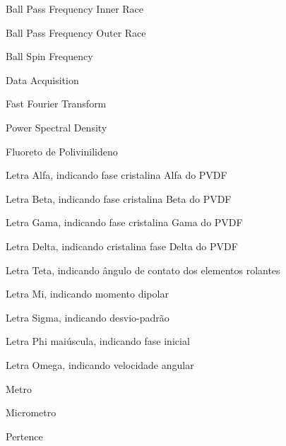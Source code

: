 \documentclass[
	12pt,				
	oneside,			
	a4paper,			
	english,			
	brazil,			
	]{abntex2ppgsi}
\begin{document}
\listoffigures*
\cleardoublepage
\listoftables*
\cleardoublepage




%
%
\begin{siglas}
  \item[BPFI] Ball Pass Frequency Inner Race
  \item[BPFO] Ball Pass Frequency Outer Race
  \item[BSF] Ball Spin Frequency 
  \item[DAQ] Data Acquisition
  \item[FFT] Fast Fourier Transform
  \item[PSD] Power Spectral Density
  \item[PVDF] Fluoreto de Polivinilideno
\end{siglas}


\begin{simbolos}
  \item[$ \alpha $] Letra Alfa, indicando fase cristalina Alfa do PVDF
  \item[$ \beta $] Letra Beta, indicando fase cristalina Beta do PVDF
  \item[$ \gamma $] Letra Gama, indicando fase cristalina Gama do PVDF
  \item[$ \delta $] Letra Delta, indicando cristalina fase Delta do PVDF
  \item[$ \theta $] Letra Teta, indicando ângulo de contato dos elementos rolantes
  \item[$ \mu $] Letra Mi, indicando momento dipolar 
  \item[$ \sigma $] Letra Sigma, indicando desvio-padrão
  \item[$ \upphi $] Letra Phi maiúscula, indicando fase inicial
  \item[$ \omega $] Letra Omega, indicando velocidade angular 
  \item[\SI{}{\metre}] Metro  
  \item[\SI{}{\micro\metre}] Micrometro
  \item[$ \in $] Pertence
\end{simbolos}
\end{document}
